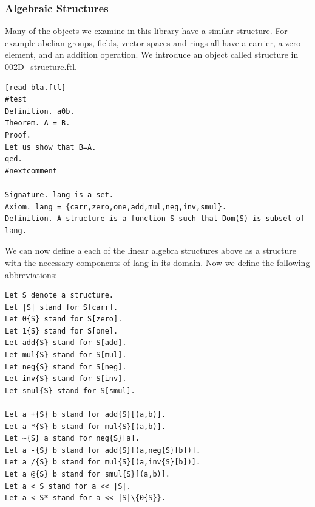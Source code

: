 \documentclass[11pt]{article}
\begin{document}
\subsubsection{Algebraic Structures}
Many of the objects we examine in this library have a similar structure. For example abelian groups, fields, vector spaces and rings all have a carrier, a zero element, and an addition operation. We introduce an object called structure in 002D\_structure.ftl.
\begin{lstlisting}
[read bla.ftl]
#test
Definition. a0b.
Theorem. A = B.
Proof.
Let us show that B=A.
qed.
#nextcomment

Signature. lang is a set.
Axiom. lang = {carr,zero,one,add,mul,neg,inv,smul}.
Definition. A structure is a function S such that Dom(S) is subset of lang.
\end{lstlisting}

We can now define a each of the linear algebra structures above as a structure with the necessary components of {\ftl lang} in its domain. Now we define the following abbreviations:
\begin{lstlisting}
Let S denote a structure.
Let |S| stand for S[carr].
Let 0{S} stand for S[zero].
Let 1{S} stand for S[one].
Let add{S} stand for S[add].
Let mul{S} stand for S[mul].
Let neg{S} stand for S[neg].
Let inv{S} stand for S[inv].
Let smul{S} stand for S[smul].

Let a +{S} b stand for add{S}[(a,b)].
Let a *{S} b stand for mul{S}[(a,b)].
Let ~{S} a stand for neg{S}[a].
Let a -{S} b stand for add{S}[(a,neg{S}[b])].
Let a /{S} b stand for mul{S}[(a,inv{S}[b])].
Let a @{S} b stand for smul{S}[(a,b)].
Let a < S stand for a << |S|.
Let a < S* stand for a << |S|\{0{S}}.
\end{lstlisting}
\end{document}

